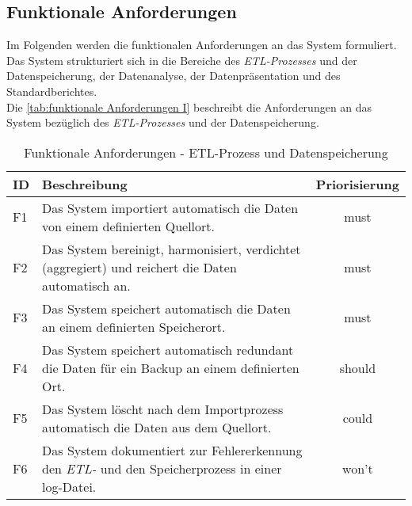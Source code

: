 

\subsection{Funktionale Anforderungen}
Im Folgenden werden die funktionalen Anforderungen an das System formuliert. Das System strukturiert sich in die Bereiche des \textit{\acrshort{ETL}-Prozesses} und der
Datenspeicherung, der Datenanalyse, der Datenpräsentation und des Standardberichtes.\\
Die \autoref{tab:funktionale Anforderungen I} beschreibt die Anforderungen an das System bezüglich des \textit{\acrshort{ETL}-Prozesses} und der Datenspeicherung.

\begingroup
\setlength{\tabcolsep}{10pt} %
\renewcommand{\arraystretch}{1.0}
\begin{table}[H]
    \centering
    \begin{adjustbox}{max width=\textwidth}
    \begin{tabular}{lp{15cm}c}
       \toprule
       \textbf{ID}          & \textbf{Beschreibung} &\textbf{Priorisierung}\\
       \midrule
        F1                               &Das System importiert automatisch die Daten von einem definierten Quellort. & must\\
        F2                              &Das System bereinigt, harmonisiert, verdichtet (aggregiert) und reichert die Daten automatisch an. & must\\
        F3                               &Das System speichert automatisch die Daten an einem definierten Speicherort.  & must\\
        F4                              &Das System speichert automatisch redundant die Daten für ein Backup an einem definierten Ort.  & should\\
        F5                             &Das System löscht nach dem Importprozess automatisch die Daten aus dem Quellort.  & could\\
        F6                             &Das System dokumentiert zur Fehlererkennung den \textit{\acrshort{ETL}-} und den Speicherprozess in einer log-Datei. & won't\\
    \bottomrule
    \end{tabular}
    \end{adjustbox}
    \caption{%
        Funktionale Anforderungen - ETL-Prozess und Datenspeicherung
    }
    \label{tab:funktionale Anforderungen I}
    \end{table}
\endgroup

